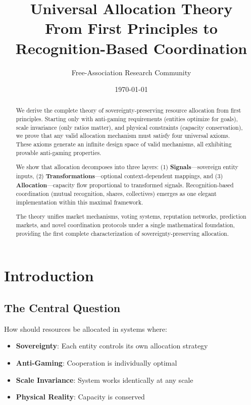 \documentclass[11pt,a4paper]{article}
\title{\textbf{Universal Allocation Theory}\\
\large From First Principles to Recognition-Based Coordination}
\author{Free-Association Research Community}
\date{\today}
\theoremstyle{definition}
\theoremstyle{remark}
\begin{document}
\maketitle

\begin{abstract}
We derive the complete theory of sovereignty-preserving resource allocation from first principles. Starting only with anti-gaming requirements (entities optimize for goals), scale invariance (only ratios matter), and physical constraints (capacity conservation), we prove that any valid allocation mechanism must satisfy four universal axioms. These axioms generate an infinite design space of valid mechanisms, all exhibiting provable anti-gaming properties.

We show that allocation decomposes into three layers: (1) \textbf{Signals}---sovereign entity inputs, (2) \textbf{Transformations}---optional context-dependent mappings, and (3) \textbf{Allocation}---capacity flow proportional to transformed signals. Recognition-based coordination (mutual recognition, shares, collectives) emerges as one elegant implementation within this maximal framework.

The theory unifies market mechanisms, voting systems, reputation networks, prediction markets, and novel coordination protocols under a single mathematical foundation, providing the first complete characterization of sovereignty-preserving allocation.
\end{abstract}

\tableofcontents
\newpage

\section{Introduction}

\subsection{The Central Question}

How should resources be allocated in systems where:
\begin{itemize}
\item \textbf{Sovereignty}: Each entity controls its own allocation strategy
\item \textbf{Anti-Gaming}: Cooperation is individually optimal
\item \textbf{Scale Invariance}: System works identically at any scale
\item \textbf{Physical Reality}: Capacity is conserved
\end{itemize}
\end{document}
